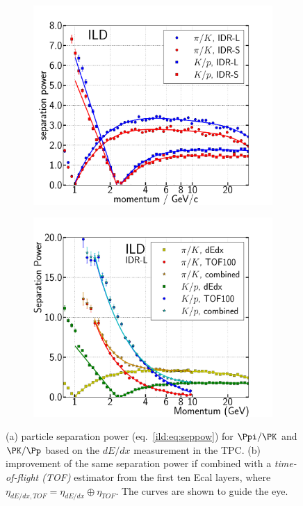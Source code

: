 \begin{figure}[htbp]
\begin{subfigure}{0.49\hsize}
 \includegraphics[width=\hsize]{Performance/fig/dEdx_ILDls_separation_power.pdf}
 \caption{ \label{fig:perf:dedx_sep}}
 \end{subfigure}
\begin{subfigure}{0.49\hsize}
 \includegraphics[width=\hsize]{Performance/fig/Combined_dEdx_TOF100_HiStat.pdf}
 \caption{  \label{fig:perf:dedxtof_sep}}
 \end{subfigure}
\caption{ (a) particle separation power (eq.~\ref{ild:eq:seppow}) for $\Ppi/\PK$ and $\PK/\Pp$ based on the $dE/dx$ measurement in the TPC.
  (b) improvement of the same separation power if combined with a {\em time-of-flight (TOF)} estimator from the first ten Ecal layers,
  where $\eta_{dE/dx,TOF}=\eta_{dE/dx} \oplus \eta_{TOF}$. The curves are shown to guide the eye.
}
\label{fig:perf:dedxtof}
\end{figure}


